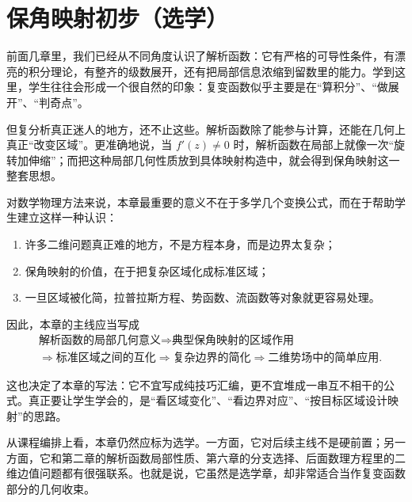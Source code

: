 
\chapter{保角映射初步（选学）}

\begin{wulibj}[本章定位]
前面几章里，我们已经从不同角度认识了解析函数：它有严格的可导性条件，有漂亮的积分理论，有整齐的级数展开，还有把局部信息浓缩到留数里的能力。学到这里，学生往往会形成一个很自然的印象：复变函数似乎主要是在``算积分''、``做展开''、``判奇点''。

但复分析真正迷人的地方，还不止这些。解析函数除了能参与计算，还能在几何上真正``改变区域''。更准确地说，当 $f'(z)\neq 0$ 时，解析函数在局部上就像一次``旋转加伸缩''；而把这种局部几何性质放到具体映射构造中，就会得到保角映射这一整套思想。

对数学物理方法来说，本章最重要的意义不在于多学几个变换公式，而在于帮助学生建立这样一种认识：
\begin{enumerate}
    \item 许多二维问题真正难的地方，不是方程本身，而是边界太复杂；
    \item 保角映射的价值，在于把复杂区域化成标准区域；
    \item 一旦区域被化简，拉普拉斯方程、势函数、流函数等对象就更容易处理。
\end{enumerate}

因此，本章的主线应当写成
\[
    \begin{aligned}
        &\text{解析函数的局部几何意义}
        \Longrightarrow
        \text{典型保角映射的区域作用} \\
        &\Longrightarrow
        \text{标准区域之间的互化}
        \Longrightarrow
        \text{复杂边界的简化}
        \Longrightarrow
        \text{二维势场中的简单应用}.
    \end{aligned}
\]

这也决定了本章的写法：它不宜写成纯技巧汇编，更不宜堆成一串互不相干的公式。真正要让学生学会的，是``看区域变化''、``看边界对应''、``按目标区域设计映射''的思路。

从课程编排上看，本章仍然应标为选学。一方面，它对后续主线不是硬前置；另一方面，它和第二章的解析函数局部性质、第六章的分支选择、后面数理方程里的二维边值问题都有很强联系。也就是说，它虽然是选学章，却非常适合当作复变函数部分的几何收束。
\end{wulibj}

